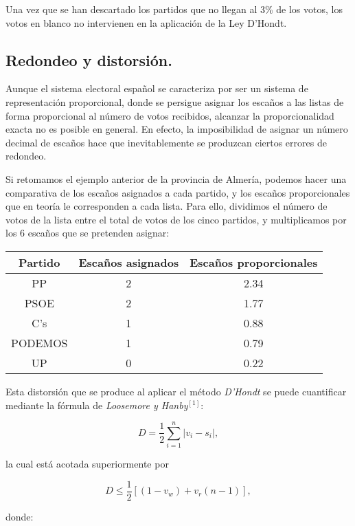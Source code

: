 \documentclass[11pt]{article}
\begin{document}
	Una vez que se han descartado los partidos que no llegan al 3\% de los votos, los votos en blanco no intervienen en la aplicación de la Ley D'Hondt.
	
	\subsection{Redondeo y distorsión.}
	
	Aunque el sistema electoral español se caracteriza por ser un sistema de representación proporcional, donde se persigue asignar los escaños a las listas de forma proporcional al número de votos recibidos, alcanzar la proporcionalidad exacta no es posible en general. En efecto, la imposibilidad de asignar un número decimal de escaños hace que inevitablemente se produzcan ciertos errores de redondeo.
	
	 Si retomamos el ejemplo anterior de la provincia de Almería, podemos hacer una comparativa de los escaños asignados a cada partido, y los escaños proporcionales que en teoría le corresponden a cada lista. Para ello, dividimos el número de votos de la lista entre el total de votos de los cinco partidos, y multiplicamos por los 6 escaños que se pretenden asignar:
	 
	 \begin{center}
	 \begin{tabular}{c|c|c}
	 \textbf{Partido} & \textbf{Escaños asignados} & \textbf{Escaños proporcionales}\\
	 \hline
	 PP & 2 & 2.34\\
	 PSOE & 2 & 1.77\\
	 C's & 1 & 0.88\\
	 PODEMOS & 1 & 0.79\\
	 UP & 0 & 0.22
	 \end{tabular}
	 \end{center}
	 Esta distorsión que se produce al aplicar el método \textit{D'Hondt} se puede cuantificar mediante la fórmula de \textit{Loosemore y Hanby}$^{[1]}$:
	 
	 \vspace{-0.5em}
	 $$D = \frac{1}{2} \sum_{i=1}^n |v_i - s_i|,$$
	 
	 \vspace{-0.5em}
	 la cual está acotada superiormente por
	 
	 \vspace{-0.5em}
	 $$D \le \frac{1}{2} \left[ (1 - v_w) + v_r(n-1) \right],$$
	 
	 \vspace{-0.5em}
	 donde:
	 
\end{document}
